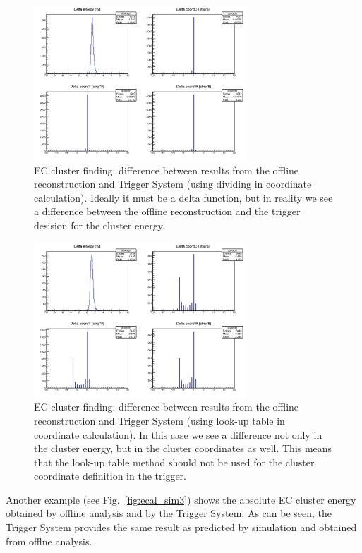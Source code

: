 \begin{figure}[htp]
	\begin{center}
		\centering
		\includegraphics[width=8cm]{img/ecal_sim1.png}
		\caption{EC cluster finding: difference between results from the offline reconstruction and Trigger System (using dividing in coordinate calculation). Ideally it must be a delta function, but in reality we see a difference between the offline reconstruction and the trigger desision for the cluster energy.}
		\label{fig:ecal_sim1}
	\end{center}
\end{figure} 

\begin{figure}[htp]
	\begin{center}
		\centering
		\includegraphics[width=8cm]{img/ecal_sim2.png}
		\caption{EC cluster finding: difference between results from the offline reconstruction and Trigger System (using look-up table in coordinate calculation). In this case we see a difference not only in the cluster energy, but in the cluster coordinates as well. This means that the look-up table method should not be used for the cluster coordinate definition in the trigger.}
		\label{fig:ecal_sim2}
	\end{center}
\end{figure} 

Another example (see Fig.~\ref{fig:ecal_sim3}) shows the absolute EC cluster energy obtained by offline analysis and by the Trigger System. As can be seen, the Trigger System provides the same result as predicted by simulation and obtained from offlne analysis.

